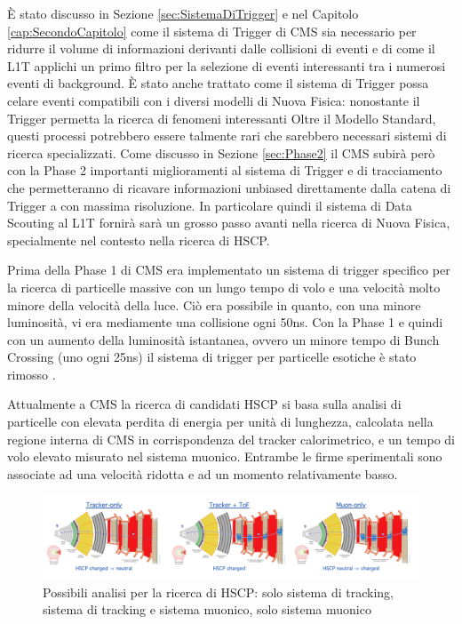 È stato discusso in Sezione \ref{sec:SistemaDiTrigger} e nel Capitolo \ref{cap:SecondoCapitolo} come il sistema di Trigger di CMS sia necessario per ridurre il volume di informazioni derivanti dalle collisioni di eventi e di come il L1T applichi un primo filtro per la selezione di eventi interessanti tra i numerosi eventi di background. È stato anche trattato come il sistema di Trigger possa celare eventi compatibili con i diversi modelli di Nuova Fisica: nonostante il Trigger permetta la ricerca di fenomeni interessanti Oltre il Modello Standard, questi processi potrebbero essere talmente rari che sarebbero necessari sistemi di ricerca specializzati. \newline
Come discusso in Sezione \ref{sec:Phase2} il CMS subirà però con la Phase 2 importanti miglioramenti al sistema di Trigger e di tracciamento che permetteranno di ricavare informazioni unbiased direttamente dalla catena di Trigger a con massima risoluzione. In particolare quindi il sistema di Data Scouting al L1T fornirà sarà un grosso passo avanti nella ricerca di Nuova Fisica, specialmente nel contesto nella ricerca di HSCP. 

Prima della Phase 1 di CMS era implementato un sistema di trigger specifico per la ricerca di particelle massive con un lungo tempo di volo e una velocità molto minore della velocità della luce. Ciò era possibile in quanto, con una minore luminosità, vi era mediamente una collisione ogni 50ns. Con la Phase 1 e quindi con un aumento della luminosità istantanea, ovvero un minore tempo di Bunch Crossing (uno ogni 25ns) il sistema di trigger per particelle esotiche è stato rimosso \cite{MasterThesisGioMoc}.

Attualmente a CMS la ricerca di candidati HSCP si basa sulla analisi di particelle con elevata perdita di energia per unità di lunghezza, calcolata nella regione interna di CMS in corrispondenza del tracker calorimetrico, e un tempo di volo elevato misurato nel sistema muonico. Entrambe le firme sperimentali sono associate ad una velocità ridotta e ad un momento relativamente basso.

\begin{figure}[t]
   \centering
     \centering
     \includegraphics[width=\textwidth]{../ImmaginiTesi/HSCPsearch.png} 
     \caption{Possibili analisi per la ricerca di HSCP: solo sistema di tracking, sistema di tracking e sistema muonico, solo sistema muonico}
   \label{fig:HSCPSearch}
 \end{figure}

